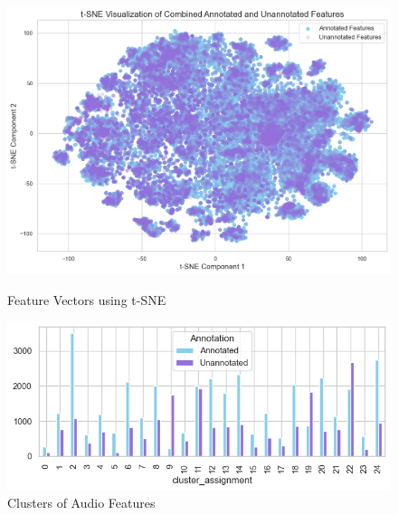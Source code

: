 \begin{figure}[h]
  \centering
  \begin{minipage}[b]{0.49\textwidth}
    \centering
    \includegraphics[width=\textwidth]{figs/Audio Features T-SNE.png}
    \caption{Feature Vectors using t-SNE}
    \label{fig:Audio Features t-SNE}
  \end{minipage}
  \hfill
  \begin{minipage}[b]{0.49\textwidth}
    \centering
    \includegraphics[width=\textwidth]{figs/Clustered Audio Features.png}
    \caption{Clusters of Audio Features}
    \label{fig:Audio Feature Clusters}
  \end{minipage}
\end{figure}

